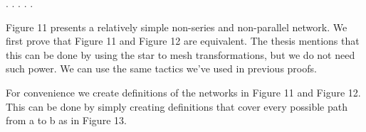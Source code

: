 \documentclass[11pt,twocolumn]{article}
\begin{document}
\begin{coqdoccode}
\coqdocindent{6.00em}
            \coqdoceol
\coqdocindent{7.00em}
   .\coqdoceol
\coqdocnoindent
{}.\coqdoceol
\coqdocindent{1.00em}
     .\coqdoceol
\coqdocindent{1.00em}
     .\coqdoceol
\coqdocnoindent
{}.\coqdoceol
\coqdocemptyline
\end{coqdoccode}


Figure 11 presents a relatively simple non-series and non-parallel
network.  We first prove that Figure 11 and Figure 12 are equivalent.
The thesis mentions that this can be done by using the star to mesh
transformations, but we do not need such power.  We can use the same
tactics we've used in previous proofs.


For convenience we create definitions of the networks in Figure 11 and
Figure 12.  This can be done by simply creating definitions that cover
every possible path from a to b as in Figure 13.
\end{document}
